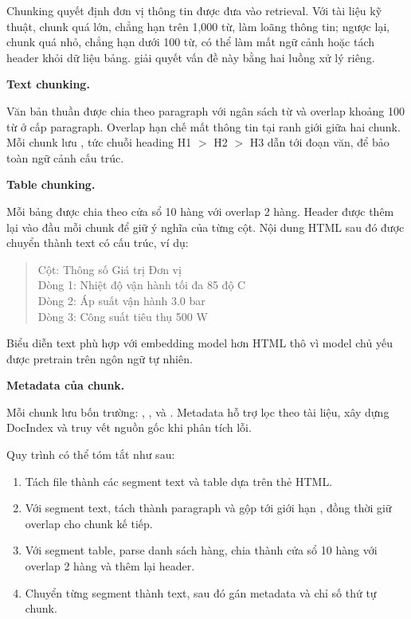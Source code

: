 \documentclass[../DoAn.tex]{subfiles}
\begin{document}
Chunking quyết định đơn vị thông tin được đưa vào retrieval. Với tài liệu kỹ thuật, chunk quá lớn, chẳng hạn trên 1,000 từ, làm loãng thông tin; ngược lại, chunk quá nhỏ, chẳng hạn dưới 100 từ, có thể làm mất ngữ cảnh hoặc tách header khỏi dữ liệu bảng.  giải quyết vấn đề này bằng hai luồng xử lý riêng.

\noindent\textbf{Text chunking.}

Văn bản thuần được chia theo paragraph với ngân sách  từ và overlap khoảng 100 từ ở cấp paragraph. Overlap hạn chế mất thông tin tại ranh giới giữa hai chunk. Mỗi chunk lưu , tức chuỗi heading H1 $>$ H2 $>$ H3 dẫn tới đoạn văn, để bảo toàn ngữ cảnh cấu trúc.

\noindent\textbf{Table chunking.}

Mỗi bảng được chia theo cửa sổ 10 hàng với overlap 2 hàng. Header được thêm lại vào đầu mỗi chunk để giữ ý nghĩa của từng cột. Nội dung HTML sau đó được chuyển thành text có cấu trúc, ví dụ:

\begin{quote}
\small\ttfamily
Cột: Thông số \textbar{} Giá trị \textbar{} Đơn vị\\
Dòng 1: Nhiệt độ vận hành tối đa \textbar{} 85 \textbar{} độ C\\
Dòng 2: Áp suất vận hành \textbar{} 3.0 \textbar{} bar\\
Dòng 3: Công suất tiêu thụ \textbar{} 500 \textbar{} W
\end{quote}

Biểu diễn text phù hợp với embedding model hơn HTML thô vì model chủ yếu được pretrain trên ngôn ngữ tự nhiên.

\noindent\textbf{Metadata của chunk.}

Mỗi chunk lưu bốn trường: , ,  và . Metadata hỗ trợ lọc theo tài liệu, xây dựng DocIndex và truy vết nguồn gốc khi phân tích lỗi.

Quy trình  có thể tóm tắt như sau:

\begin{enumerate}
    \item Tách file  thành các segment text và table dựa trên thẻ HTML.
    \item Với segment text, tách thành paragraph và gộp tới giới hạn , đồng thời giữ overlap cho chunk kế tiếp.
    \item Với segment table, parse danh sách hàng, chia thành cửa sổ 10 hàng với overlap 2 hàng và thêm lại header.
    \item Chuyển từng segment thành text, sau đó gán metadata và chỉ số thứ tự chunk.
\end{enumerate}
\end{document}
